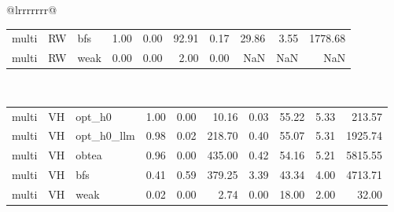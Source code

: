 \begin{table}[ht]
\begin{tabular}{@{}lrrrrrrr@{}}
\begin{tabular}{lllrrrrrrr}
multi & RW & bfs & 1.00 & 0.00 & 92.91 & 0.17 & 29.86 & 3.55 & 1778.68 \\
multi & RW & weak & 0.00 & 0.00 & 2.00 & 0.00 & NaN & NaN & NaN \\
\bottomrule
\end{tabular}
\midrule
{} \\
\begin{tabular}{lllrrrrrrr}
\toprule
\midrule
multi & VH & opt_h0 & 1.00 & 0.00 & 10.16 & 0.03 & 55.22 & 5.33 & 213.57 \\
multi & VH & opt_h0_llm & 0.98 & 0.02 & 218.70 & 0.40 & 55.07 & 5.31 & 1925.74 \\
multi & VH & obtea & 0.96 & 0.00 & 435.00 & 0.42 & 54.16 & 5.21 & 5815.55 \\
multi & VH & bfs & 0.41 & 0.59 & 379.25 & 3.39 & 43.34 & 4.00 & 4713.71 \\
multi & VH & weak & 0.02 & 0.00 & 2.74 & 0.00 & 18.00 & 2.00 & 32.00 \\
\bottomrule
\end{tabular}
\midrule
\bottomrule
\end{tabular}
\end{table}
\clearpage
